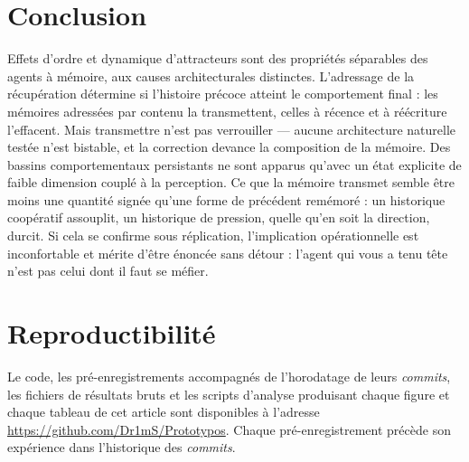 \documentclass[11pt]{article}
\begin{document}
\section{Conclusion}

Effets d'ordre et dynamique d'attracteurs sont des propriétés séparables des agents à
mémoire, aux causes architecturales distinctes. L'adressage de la récupération
détermine si l'histoire précoce atteint le comportement final : les mémoires adressées
par contenu la transmettent, celles à récence et à réécriture l'effacent. Mais
transmettre n'est pas verrouiller --- aucune architecture naturelle testée n'est
bistable, et la correction devance la composition de la mémoire. Des bassins
comportementaux persistants ne sont apparus qu'avec un état explicite de faible
dimension couplé à la perception. Ce que la mémoire transmet semble être moins une
quantité signée qu'une forme de précédent remémoré : un historique coopératif
assouplit, un historique de pression, quelle qu'en soit la direction, durcit. Si cela
se confirme sous réplication, l'implication opérationnelle est inconfortable et mérite
d'être énoncée sans détour : l'agent qui vous a tenu tête n'est pas celui dont il faut
se méfier.

\section*{Reproductibilité}

Le code, les pré-enregistrements accompagnés de l'horodatage de leurs \emph{commits},
les fichiers de résultats bruts et les scripts d'analyse produisant chaque figure et
chaque tableau de cet article sont disponibles à l'adresse \url{https://github.com/Dr1mS/Prototypos}.
Chaque pré-enregistrement précède son expérience dans l'historique des \emph{commits}.
\end{document}
